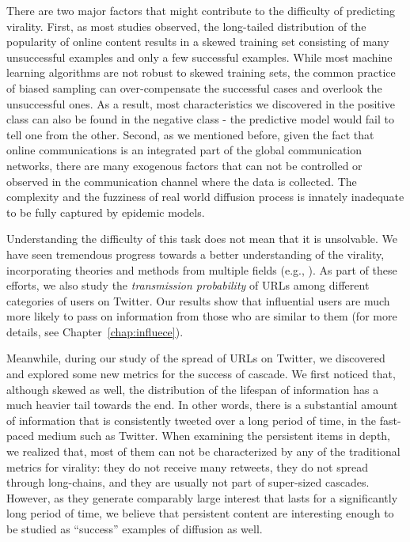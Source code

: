 \documentclass[phd,tocprelim]{cornell}
\begin{document}
There are two major factors that might contribute to the difficulty of predicting virality. First, as most studies observed, the long-tailed distribution of the popularity of online content results in a skewed training set consisting of many unsuccessful examples and only a few successful examples. While most machine learning algorithms are not robust to skewed training sets\cite{Provost-2000}, the common practice of biased sampling can over-compensate the successful cases and overlook the unsuccessful ones. As a result, most characteristics we discovered in the positive class can also be found in the negative class - the predictive model would fail to tell one from the other. Second, as we mentioned before, given the fact that online communications is an integrated part of the global communication networks, there are many exogenous factors that can not be controlled or observed in the communication channel where the data is collected. The complexity and the fuzziness of real world diffusion process is innately inadequate to be fully captured by epidemic models\cite{Bakshy-2011,Cha-2010}.

Understanding the difficulty of this task does not mean that it is unsolvable. We have seen tremendous progress towards a better understanding of the virality, incorporating theories and methods from multiple fields (e.g., \cite{Centola:2007, Bakshy-2011}). As part of these efforts, we also study the \emph{transmission probability} of URLs among different categories of users on Twitter. Our results show that influential users are much more likely to pass on information from those who are similar to them (for more details, see Chapter~\ref{chap:influece}).

Meanwhile, during our study of the spread of URLs on Twitter, we discovered and explored some new metrics for the success of cascade. We first noticed that,  although skewed as well, the distribution of the lifespan of information has a much heavier tail towards the end. In other words, there is a substantial amount of information that is consistently tweeted over a long period of time, in the fast-paced medium such as Twitter. When examining the persistent items in depth, we realized that, most of them can not be characterized by any of the traditional metrics for virality: they do not receive many retweets, they do not spread through long-chains, and they are usually not part of super-sized cascades. However, as they generate comparably large interest that lasts for a significantly long period of time, we believe that persistent content are interesting enough to be studied as ``success'' examples of diffusion as well.
\end{document}
